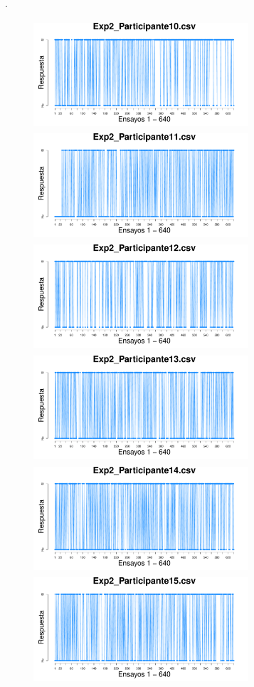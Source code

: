 \documentclass[a4paper ]{article}
\begin{document}
\vfill .
\begin{figure}[th]
\begin{center}
\includegraphics[width=8cm, height=4cm]{Figures/Response_Exp2_P10} \includegraphics[width=8cm, height=4cm]{Figures/Response_Exp2_P11} \includegraphics[width=8cm, height=4cm]{Figures/Response_Exp2_P12}
\includegraphics[width=8cm, height=4cm]{Figures/Response_Exp2_P13} \includegraphics[width=8cm, height=4cm]{Figures/Response_Exp2_P14} \includegraphics[width=8cm, height=4cm]{Figures/Response_Exp2_P15}

\end{center}
\end{figure}
\end{document}
